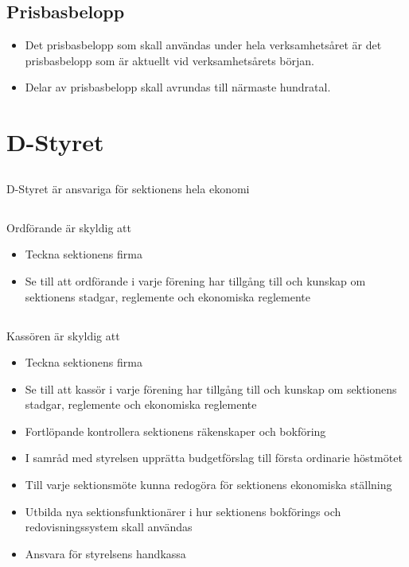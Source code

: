 \documentclass[a4paper, 10pt]{article}
\begin{document}
\subsection{Prisbasbelopp}
\begin{itemize}
  \item Det prisbasbelopp som skall användas under hela verksamhetsåret är det prisbasbelopp som är aktuellt vid verksamhetsårets början.
  \item Delar av prisbasbelopp skall avrundas till närmaste hundratal. 
\end{itemize}

\section{D-Styret}
\subsection{}
D-Styret är ansvariga för sektionens hela ekonomi
\subsection{}
Ordförande är skyldig att
\begin{itemize}
  \item Teckna sektionens firma
  \item Se till att ordförande i varje förening har tillgång till och kunskap om sektionens stadgar, reglemente och ekonomiska reglemente 
\end{itemize}
\subsection{}
Kassören är skyldig att
\begin{itemize}
  \item Teckna sektionens firma
  \item Se till att kassör i varje förening har tillgång till och kunskap om sektionens stadgar, reglemente och ekonomiska reglemente 
  \item Fortlöpande kontrollera sektionens räkenskaper och bokföring
  \item I samråd med styrelsen upprätta budgetförslag till första ordinarie höstmötet
  \item Till varje sektionsmöte kunna redogöra för sektionens ekonomiska ställning
  \item Utbilda nya sektionsfunktionärer i hur sektionens bokförings och redovisningssystem skall användas
  \item Ansvara för styrelsens handkassa
\end{itemize}
\end{document}

